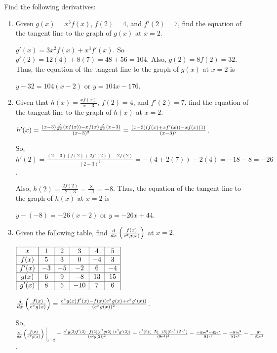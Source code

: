 \documentclass[handout,nooutcomes]{ximera}
\begin{document}
\begin{problem}
Find the following derivatives:
	\begin{enumerate}
	
	\item  Given $g(x) = x^3 f(x)$, $f(2) = 4$, and $f'(2) = 7$, find the equation of the tangent line to the graph of $g(x)$ at $x=2$.
		\begin{freeResponse}
		$g'(x) = 3x^2 f(x) + x^3 f'(x)$.  So $g'(2) = 12(4) + 8(7) = 48 + 56 = 104$.  Also, $g(2) = 8f(2) = 32$.  Thus, the equation of the tangent line to the graph of $g(x)$ at $x=2$ is
		
		$y-32 = 104(x-2)$ or $y = 104x - 176$.  
		\end{freeResponse}
		
		
		
	\item  Given that $h(x) = \frac{x f(x)}{x-3}$, $f(2) = 4$, and $f'(2) = 7$, find the equation of the tangent line to the graph of $h(x)$ at $x=2$.  
		\begin{freeResponse}
		$h'(x) = \frac{ (x-3)\frac{d}{dx}(xf(x)) - xf(x)\frac{d}{dx}(x-3)}{(x-3)^2}
		= \frac{(x-3)(f(x) + xf'(x)) - xf(x)(1)}{(x-3)^2}$.
		
		So, $h'(2) = 
		\frac{(2-3)(f(2) + 2f'(2)) - 2f(2)}{(2-3)^2}
		= -(4 + 2(7)) - 2(4)
		= -18 - 8 = -26$.
		
		Also, $h(2) = \frac{2f(2)}{2-3} = \frac{8}{-1} = -8$.  Thus, the equation of the tangent line to the graph of $h(x)$ at $x=2$ is
		
		$y-(-8) = -26(x-2)$ or $y = -26x + 44$.  
		\end{freeResponse}
		
		
		
	\item  Given the following table, find $\frac{d}{dx} \left( \frac{f(x)}{e^x g(x)} \right)$ at $x=2$. 
	
	$\begin{array}{|c|c|c|c|c|c|}
	\hline
	x	&	1	&	2	&	3	&	4	&	5	\\
	\hline
	f(x)	&	5	&	3	&	0	&	-4	&	3	\\
	\hline
	f'(x)	&	-3	&	-5	&	-2	&	6	&	-4	\\
	\hline
	g(x)	&	6	&	9	&	-8	&	13	&	15	\\
	\hline
	g'(x)	&	8	&	5	&	-10	&	7	&	6	\\
	\hline
	\end{array}$
	
	 
		\begin{freeResponse}
		$\frac{d}{dx} \left( \frac{f(x)}{e^x g(x)} \right)
		= \frac{e^x g(x) f'(x) - f(x)(e^x g(x) + e^x g'(x))}{(e^x g(x))^2}$.
		
		So, $\frac{d}{dx}\left(\frac{f(x)}{e^x g(x)}\right) \bigg|_{x=2}
		= \frac{e^2 g(2) f'(2) - f(2)(e^2 g(2) + e^2 g'(2))}{(e^2 g(2))^2}
		= \frac{e^2 (9)(-5) - (3)(9e^2 + 5e^2)}{(9e^2)^2}
		= \frac{-45e^2 -42e^2}{81e^4}
		= \frac{-87e^2}{81e^4}
		= - \frac{87}{81e^2}$.
		\end{freeResponse}
		
		
		
	\end{enumerate}
		
\end{problem}
\end{document}
